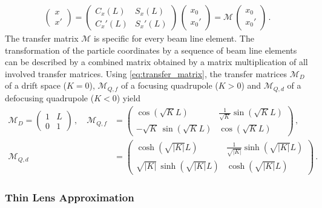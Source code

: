 %
\begin{align}
\begin{pmatrix} x \\ x' \end{pmatrix} = \begin{pmatrix} C_x (L) & S_x(L) \\ C_x'(L) & S_x'(L)  \end{pmatrix} \, \begin{pmatrix} x_0 \\ x_0' \end{pmatrix} = \mathcal{M} \, \begin{pmatrix} x_0 \\ x_0' \end{pmatrix} \, . \label{eq:transfer_matrix}
\end{align}
%
The transfer matrix $\mathcal{M}$ is specific for every beam line element. The transformation of the particle coordinates by a sequence of beam line elements can be described by a combined matrix obtained by a matrix multiplication of all involved transfer matrices. 
Using \eqref{eq:transfer_matrix}, the transfer matrices $\mathcal{M}_D$ of a drift space ($K=0$), $\mathcal{M}_{Q,f}$ of a focusing quadrupole ($K>0$) and $\mathcal{M}_{Q,d}$ of a defocusing quadrupole ($K<0$) yield
\begin{align}
  \mathcal{M}_D = \begin{pmatrix} 1 & L \\ 0 & 1   \end{pmatrix} \,, \quad %
\mathcal{M}_{Q,f} &=  \begin{pmatrix} \cos \left(\sqrt{K}L\right) &  \frac{1}{\sqrt{K}}\sin \left(\sqrt{K}L\right) \\ - \sqrt{K} \, \sin \left( \sqrt{K} L \right) & \cos \left(\sqrt{K} L \right)    \end{pmatrix}  \, , \\ 
%
\mathcal{M}_{Q,d} &=  \begin{pmatrix} \cosh \left(\sqrt{|K|}L\right) &  \frac{1}{\sqrt{|K|}}\sinh \left(\sqrt{|K|}L\right) \\  \sqrt{|K|} \, \sinh \left( \sqrt{|K|} L \right) & \cosh \left(\sqrt{|K|} L \right)    \end{pmatrix}  \,.
%
\end{align}



\subsubsection{Thin Lens Approximation}


